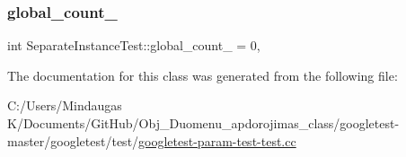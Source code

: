 \mbox{\label{class_separate_instance_test_a79db6d4cdd6c99b256439cc020f782ef}} 
\subsubsection{\texorpdfstring{global\_count\_}{global\_count\_}}
{\footnotesize\ttfamily int Separate\+Instance\+Test\+::global\+\_\+count\+\_\+ = 0\hspace{0.3cm}{\ttfamily [static]}, {\ttfamily [protected]}}



The documentation for this class was generated from the following file\+:\begin{DoxyCompactItemize}
\item 
C\+:/\+Users/\+Mindaugas K/\+Documents/\+Git\+Hub/\+Obj\+\_\+\+Duomenu\+\_\+apdorojimas\+\_\+class/googletest-\/master/googletest/test/\mbox{\hyperlink{googletest-master_2googletest_2test_2googletest-param-test-test_8cc}{googletest-\/param-\/test-\/test.\+cc}}\end{DoxyCompactItemize}
